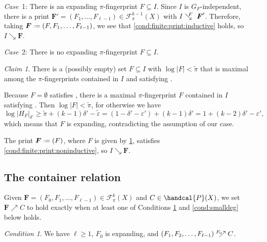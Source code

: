 \documentclass[12pt,reqno]{amsart}
\theoremstyle{plain}
\theoremstyle{definition}
\theoremstyle{remark}
\newtheorem{condition}[equation]{Condition}
\newtheorem{claim}[equation]{Claim}
\newenvironment{case}[2]{\smallskip\par\noindent \textit{Case}~#1: \rmfamily #2.}{}
\newcommand{\0}{\mathbb{\emptyset}}
\newcommand{\Pow}{\handcal{P}}
\newcommand*{\defeq}{\mathrel{\vcenter{\baselineskip0.5ex \lineskiplimit0pt \hbox{\scriptsize.}\hbox{\scriptsize.}}}=}
\newcommand{\de}{\delta}
\newcommand{\e}{\varepsilon}
\newcommand{\FC}{\mathcal{F}}
\newcommand{\capsize}[2]{\left|#2\right|_{#1}}
\newcommand{\Prints}[1][k]{\FC_\pi^{#1}(X)}
\newcommand{\Print}{\boldsymbol{F}}
\newcommand{\prel}{\searrow}
\newcommand{\crel}{\nearrow}
\newcommand{\prelG}[1]{\mathrel{\;\:\mathclap{\searrow}{{}^{#1}}\;}}
\newcommand{\crelG}[1]{\mathrel{{}^{#1}\mathclap{\nearrow}{\;\:}}}
\begin{document}
\begin{case}{1}{There is an expanding $\pi$-fingerprint $F \subseteq I$}
	Since $I$ is $G_F$-independent, there is a print $\Print' = (F_1, \hdots, F_{\ell - 1}) \in \Prints[k-1]$ with $I \prelG{F} \Print'$. Therefore, taking $\Print \defeq (F, F_1, \hdots, F_{\ell - 1})$, we see that \cref{cond:finite:print:inductive} holds, so $I \prel \Print$.
\end{case}

\begin{case}{2}{There is no expanding $\pi$-fingerprint $F \subseteq I$}
	
	\begin{claim}\label{claim:there_is_a_fingerprint}
		There is a (possibly empty) set $F \subseteq I$ with $\log|F| < \tilde\pi$ that is maximal among the $\pi$-fingerprints contained in $I$ and satisfying .
	\end{claim}
	\begin{pf}
		Because $F = \0$ satisfies , there is a maximal $\pi$-fingerprint $F$ contained in $I$ satisfying . Then $\log|F| < \tilde\pi$, for otherwise we have \[\log\capsize{\de'}{H_F} \ge \tilde\pi + (k-1) \de' - \tilde\e = (1 - \de' - \e') + (k-1) \de' = 1 + (k-2) \de' - \e',\] which means that $F$ is expanding, contradicting the assumption of our case.
	\end{pf}
	
	\noindent The print $\Print \defeq (F)$, where $F$ is given by \cref{claim:there_is_a_fingerprint}, satisfies \cref{cond:finite:print:noninductive}, so $I \prel \Print$.
\end{case}

\subsection{The container relation}\label{subsec:container}

Given $\Print = (F_0, F_1, \hdots, F_{\ell-1}) \in \Prints$ and $C \in \Pow(X)$, we set $\Print \crel C$ to hold exactly when at least one of Conditions \ref{cond:finite:container:inductive} and \ref{cond:smalldeg} below holds.

\begin{condition}\label{cond:finite:container:inductive}
	We have $\ell \geq 1$, $F_0$ is expanding, and $(F_1, F_2, \hdots, F_{\ell-1}) \crelG{F_0} C$.
\end{condition}
\end{document}
